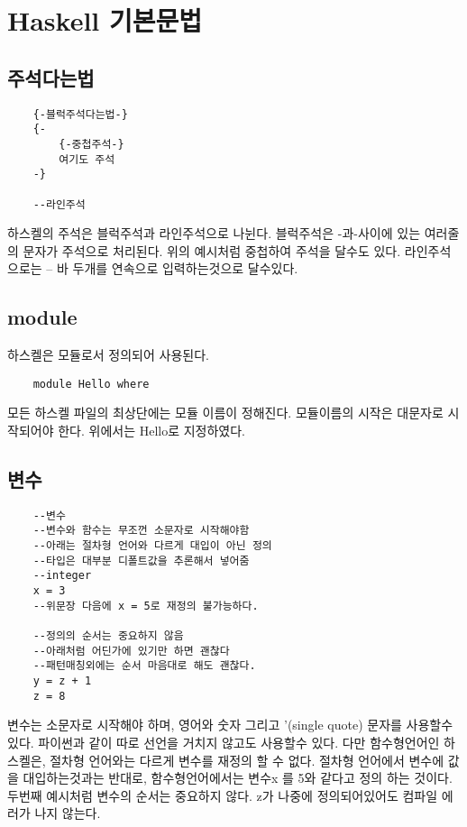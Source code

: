 \documentclass{article}
\begin{document}
\section{Haskell 기본문법}

\subsection{주석다는법}
\begin{verbatim}
    {-블럭주석다는법-}
    {-
        {-중첩주석-}
        여기도 주석
    -}
    
    --라인주석
\end{verbatim}
하스켈의 주석은 블럭주석과 라인주석으로 나뉜다. 블럭주석은 {-과-}사이에 있는 여러줄의 문자가 주석으로 처리된다. 위의 예시처럼 중첩하여 주석을 달수도 있다. 라인주석으로는 -- 바 두개를 연속으로 입력하는것으로 달수있다.  

\subsection{module}
하스켈은 모듈로서 정의되어 사용된다.
\begin{verbatim}
    module Hello where
\end{verbatim}
모든 하스켈 파일의 최상단에는 모듈 이름이 정해진다. 모듈이름의 시작은 대문자로 시작되어야 한다. 위에서는 Hello로 지정하였다.

\subsection{변수}
\begin{verbatim}
    --변수
    --변수와 함수는 무조껀 소문자로 시작해야함
    --아래는 절차형 언어와 다르게 대입이 아닌 정의
    --타입은 대부분 디폴트값을 추론해서 넣어줌
    --integer
    x = 3
    --위문장 다음에 x = 5로 재정의 불가능하다.
    
    --정의의 순서는 중요하지 않음
    --아래처럼 어딘가에 있기만 하면 괜찮다
    --패턴매칭외에는 순서 마음대로 해도 괜찮다.
    y = z + 1
    z = 8
\end{verbatim}
변수는 소문자로 시작해야 하며, 영어와 숫자 그리고 '(single quote) 문자를 사용할수 있다. 파이썬과 같이 따로 선언을 거치지 않고도 사용할수 있다. 다만 함수형언어인 하스켈은, 절차형 언어와는 다르게 변수를 재정의 할 수 없다. 절차형 언어에서 변수에 값을 대입하는것과는 반대로, 함수형언어에서는 변수x 를 5와 같다고 정의 하는 것이다. 두번째 예시처럼 변수의 순서는 중요하지 않다. z가 나중에 정의되어있어도 컴파일 에러가 나지 않는다.
\end{document}
